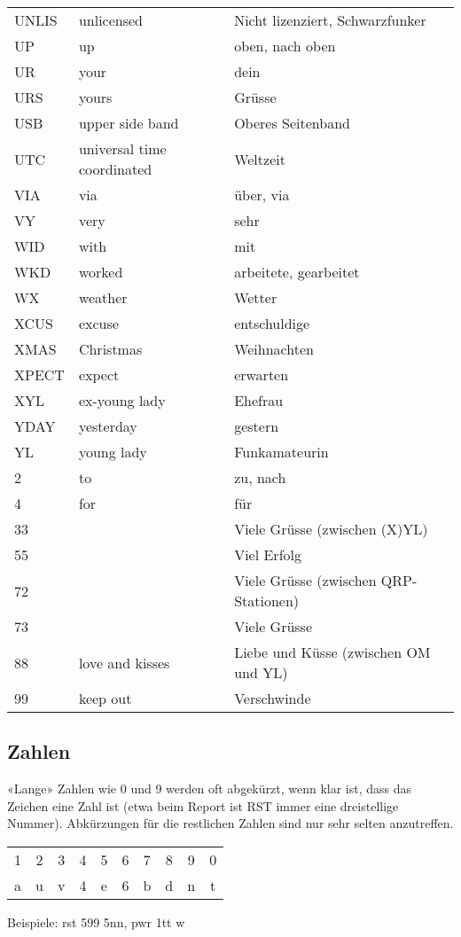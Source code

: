 {\begin{xtabular}{lll}
UNLIS & unlicensed & Nicht lizenziert, Schwarzfunker \\
UP & up & oben, nach oben \\
UR & your & dein \\
URS & yours & Grüsse \\
USB & upper side band & Oberes Seitenband \\
UTC & universal time coordinated & Weltzeit \\
VIA & via & über, via \\
VY & very & sehr \\
WID & with & mit \\
WKD & worked & arbeitete, gearbeitet \\
WX & weather & Wetter \\
XCUS & excuse & entschuldige \\
XMAS & Christmas & Weihnachten \\
XPECT & expect & erwarten \\
XYL & ex-young lady & Ehefrau \\
YDAY & yesterday & gestern \\
YL & young lady & Funkamateurin \\
2 & to & zu, nach \\
4 & for & für \\
33 &  & Viele Grüsse (zwischen (X)YL) \\
55 &  & Viel Erfolg \\
72 &  & Viele Grüsse (zwischen QRP-Stationen) \\
73 &  & Viele Grüsse \\
88 & love and kisses & Liebe und Küsse (zwischen OM und YL) \\
99 & keep out & Verschwinde
\end{xtabular}
}

\subsection{Zahlen}
«Lange» Zahlen wie 0 und 9 werden oft abgekürzt, wenn klar ist, dass das Zeichen eine Zahl ist (etwa beim Report ist RST immer eine dreistellige Nummer). Abkürzungen für die restlichen Zahlen sind nur sehr selten anzutreffen.

\begin{tabular}{cccccccccc}
1 & 2 & 3 & 4 & 5 & 6 & 7 & 8 & 9 & 0 \\
a & u & v & 4 & e & 6 & b & d & n & t
\end{tabular}

Beispiele: rst 599 5nn, pwr 1tt w


